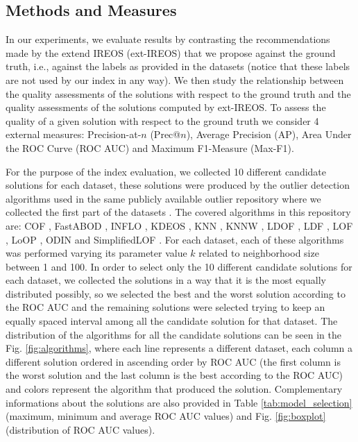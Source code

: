\subsection{Methods and Measures}
In our experiments, we evaluate results by contrasting the recommendations made by the extend IREOS (ext-IREOS) that we propose against the ground truth, i.e., against the labels as provided in the datasets (notice that these labels are not used by our index in any way). We then study the relationship between the quality assessments of the solutions with respect to the ground truth and the quality assessments of the solutions computed by ext-IREOS. To assess the quality of a given solution with respect to the ground truth we consider 4 external measures: Precision-at-$n$ (Prec@$n$), Average Precision (AP), Area Under the ROC Curve (ROC AUC) and Maximum F1-Measure (Max-F1).

For the purpose of the index evaluation, we collected 10 different candidate solutions for each dataset, these solutions were produced by the outlier detection algorithms used in the same publicly available outlier repository where we collected the first part of the datasets \cite{campos2016}. The covered algorithms in this repository are: COF \cite{tang2002}, FastABOD \cite{kriegel2008}, INFLO \cite{jin2006}, KDEOS \cite{schubert2014b}, KNN \cite{ramaswamy2000}, KNNW \cite{angiulli2002,angiulli2005}, LDOF \cite{zhang2009}, LDF \cite{latecki2007}, LOF \cite{breunig2000}, LoOP \cite{kriegel2009}, ODIN \cite{hautamaki2004} and SimplifiedLOF \cite{schubert2014}. For each dataset, each of these algorithms was performed varying its parameter value $k$ related to neighborhood size between 1 and 100. In order to select only the 10 different candidate solutions for each dataset, we collected the solutions in a way that it is the most equally distributed possibly, so we selected the best and the worst solution according to the ROC AUC and the remaining solutions were selected trying to keep an equally spaced interval among all the candidate solution for that dataset. The distribution of the algorithms for all the candidate solutions can be seen in the Fig. \ref{fig:algorithms}, where each line represents a different dataset, each column a different solution ordered in ascending order by ROC AUC (the first column is the worst solution and the last column is the best according to the ROC AUC) and colors represent the algorithm that produced the solution. Complementary informations about the solutions are also provided in Table \ref{tab:model_selection} (maximum, minimum and average ROC AUC values) and Fig. \ref{fig:boxplot} (distribution of ROC AUC values).

